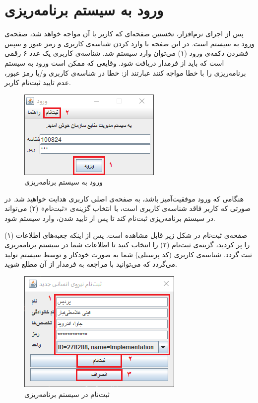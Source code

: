 \section{ورود به سیستم برنامه‌ریزی}
پس از اجرای نرم‌افزار، نخستین صفحه‌ای که کاربر با آن مواجه خواهد شد، صفحه‌ی ورود به سیستم است. در این صفحه با وارد کردن شناسه‌ی کاربری و رمز عبور و سپس فشردن دکمه‌ی ورود  (۱) می‌توان وارد سیستم شد. شناسه‌ی کاربری یک عدد ۶ رقمی است که باید از فرمدار دریافت شود. وقایعی که ممکن است ورود به سیستم برنامه‌ریزی را با خطا مواجه کنند عبارتند از: خطا در شناسه‌ی کاربری و/یا رمز عبور، عدم تایید ثبت‌نام کاربر.
	\begin{figure}[H]
		\centering
		\includegraphics[scale=0.8]{img/manual/login}
		\caption{ورود به سیستم برنامه‌ریزی}
	\end{figure}

هنگامی که ورود موفقیت‌آمیز باشد، به صفحه‌ی اصلی کاربری هدایت خواهید شد. در صورتی که کاربر فاقد شناسه‌ی کاربری است، با انتخاب گزینه‌ی «ثبت‌نام»   (۲) می‌تواند در سیستم برنامه‌ریزی ثبت‌نام کند تا پس از تایید شدن، وارد سیستم شود.

صفحه‌ی ثبت‌نام در شکل زیر قابل مشاهده است. پس از اینکه جعبه‌های اطلاعات (۱) را پر کردید، گزینه‌ی ثبت‌نام (۲) را انتخاب کنید تا اطلاعات شما در سیستم برنامه‌ریزی ثبت گردد. شناسه‌ی کاربری (کد پرسنلی) شما به صورت خودکار و توسط سیستم تولید می‌گردد که می‌توانید با مراجعه به فرمدار
از آن مطلع شوید.

	\begin{figure}[H]
		\centering
		\includegraphics[scale=0.8]{img/manual/register}
		\caption{ثبت‌نام در سیستم برنامه‌ریزی}
	\end{figure}


